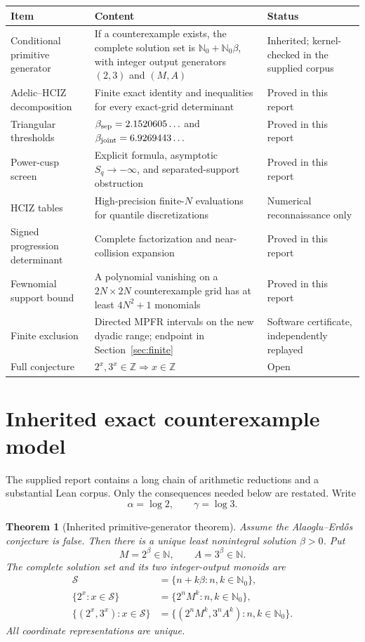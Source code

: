 \documentclass[11pt]{article}
\newcommand{\N}{\mathbb N}
\newcommand{\Nzero}{\mathbb N_0}
\newcommand{\Z}{\mathbb Z}
\newcommand{\1}{\mathbf 1}
\theoremstyle{plain}
\newtheorem{theorem}{Theorem}[section]
\theoremstyle{definition}
\theoremstyle{remark}
\begin{document}
\begin{center}
\begin{tabularx}{\textwidth}{@{}>{\raggedright\arraybackslash}p{}
>{\raggedright\arraybackslash}p{}
>{\raggedright\arraybackslash}X@{}}
\toprule
Item & Content & Status \\
\midrule
Conditional primitive generator & If a counterexample exists, the complete solution set is
$\Nzero+\Nzero\beta$, with integer output generators $(2,3)$ and $(M,A)$ &
Inherited; kernel-checked in the supplied corpus \\
Adelic--HCIZ decomposition & Finite exact identity and inequalities for every exact-grid determinant &
Proved in this report \\
Triangular thresholds & $\beta_{\rm sep}=2.1520605\ldots$ and
$\beta_{\rm joint}=6.9269443\ldots$ & Proved in this report \\
Power-cusp screen & Explicit formula, asymptotic $S_q\to-\infty$, and separated-support obstruction &
Proved in this report \\
HCIZ tables & High-precision finite-$N$ evaluations for quantile discretizations &
Numerical reconnaissance only \\
Signed progression determinant & Complete factorization and near-collision expansion &
Proved in this report \\
Fewnomial support bound & A polynomial vanishing on a $2N\times2N$ counterexample grid has at least $4N^2+1$ monomials &
Proved in this report \\
Finite exclusion & Directed MPFR intervals on the new dyadic range; endpoint in Section~\ref{sec:finite} &
Software certificate, independently replayed \\
Full conjecture & $2^x,3^x\in\Z\Rightarrow x\in\Z$ & Open \\
\bottomrule
\end{tabularx}
\end{center}

\section{Inherited exact counterexample model}\label{sec:model}

The supplied report contains a long chain of arithmetic reductions and a
substantial Lean corpus.  Only the consequences needed below are restated.
Write
\[
 \alpha=\log2,\qquad \gamma=\log3.
\]

\begin{theorem}[Inherited primitive-generator theorem]\label{thm:primitive-generator}
Assume the Alaoglu--Erd\H{o}s conjecture is false.  Then there is a unique
least nonintegral solution $\beta>0$.  Put
\[
 M=2^\beta\in\N,\qquad A=3^\beta\in\N.
\]
The complete solution set and its two integer-output monoids are
\begin{align*}
 \mathcal S&=\{n+k\beta:n,k\in\Nzero\},\\
 \{2^x:x\in\mathcal S\}&=\{2^nM^k:n,k\in\Nzero\},\\
 \{(2^x,3^x):x\in\mathcal S\}
   &=\{(2^nM^k,3^nA^k):n,k\in\Nzero\}.
\end{align*}
All coordinate representations are unique.
\end{theorem}
\end{document}
